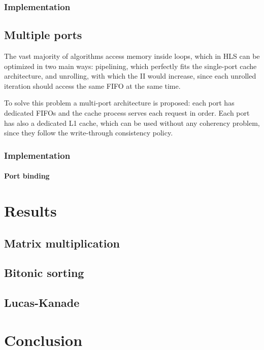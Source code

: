 \documentclass[11pt,a4paper]{memoir}
\begin{document}
\subsection{Implementation}

\section{Multiple ports}
The vast majority of algorithms access memory inside loops, which in HLS can be
optimized in two main ways: pipelining, which perfectly fits the single-port
cache architecture, and unrolling, with which the II would increase, since each
unrolled iteration should access the same FIFO at the same time.

To solve this problem a multi-port architecture is proposed: each port has
dedicated FIFOs and the cache process serves each request in order.
Each port has also a dedicated L1 cache, which can be used without any
coherency problem, since they follow the write-through consistency policy.

\subsection{Implementation}
\subsubsection{Port binding}


\chapter{Results}
\section{Matrix multiplication}
\section{Bitonic sorting}
\section{Lucas-Kanade}

\chapter{Conclusion}

\printbibliography
\end{document}
